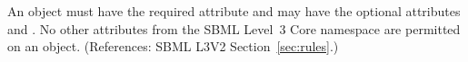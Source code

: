 An \AssignmentRule object must have the required attribute 
and may have the optional attributes   and .
No other attributes from the SBML Level~3 Core namespace are permitted on
an \AssignmentRule object.  (References: SBML L3V2
Section~\ref{sec:rules}.)

